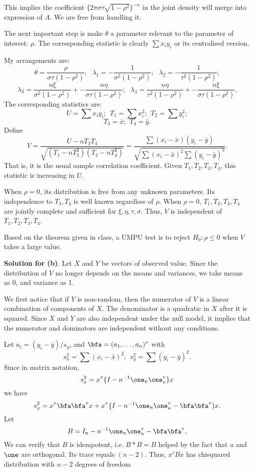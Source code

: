 This implies the coefficient $\{2\pi \sigma \tau \sqrt{1-\rho^2}\}^{-n}$
in the joint density will merge into expression of $A$. We are free
from handling it.

The next important step is make $\theta$ a parameter relevant to
the parameter of interest: $\rho$. The corresponding statistic
is clearly $\sum x_i y_i$ or its centralised version.

My arrangements are:
\[
\theta = \frac{ \rho}{\sigma \tau (1-\rho^2)}; ~~~
\lambda_1 =  - \frac{1 }{\sigma^2 (1-\rho^2)}; ~~~
\lambda_2 =  - \frac{1}{ \tau^2 (1-\rho^2)};
\]
\[
\lambda_3 =  
 \frac{n \xi }{\sigma^2 (1-\rho^2)} +- \frac{n \eta }{\sigma \tau (1-\rho^2)}; ~~~
\lambda_4 = 
 \frac{n \eta }{\tau^2 (1-\rho^2)} +- \frac{n \xi }{\sigma \tau (1-\rho^2)}.
\]
The corresponding statistics are:
\[
U = \sum x_i y_i; ~~T_1 = \sum x_i^2 ; ~~T_2 = \sum y_i^2;
\]
\[
T_3 = \bar x; ~~T_4 = \bar y.
\]
Define
\[
V = \frac{U - n T_3 T_4}{\sqrt{ (T_1 - n T_3^2) (T_2 - n T_4^2)}}
=
\frac{ \sum (x_i - \bar x)(y_i - \bar y)}
{\sqrt{\sum (x_i - \bar x)^2 \sum (y_i - \bar y)^2}}.
\]
That is, it is the usual sample correlation coefficient.
Given $T_1, T_2, T_3, T_4$, this statistic is increasing in $U$.

When $\rho = 0$, its distribution is free from any unknown parameters.
Its independence to $ T_3, T_4$ is well known regardless of $\rho$.
When $\rho = 0$, $T_1, T_2, T_3, T_4$ are jointly complete
and sufficient for $\xi, \eta, \tau, \sigma$. Thus,
$V$ is independent of $T_1, T_2, T_3, T_4$.

Based on the theorem given in class, a UMPU test is
to reject $H_0: \rho \leq 0$ when $V$ takes a large value.

{\bf Solution for (b)}. 
Let $X$ and $Y$ be vectors of observed value.
Since the distribution of $V$ no longer depends on the means
and variances, we take means as 0, and variance as 1.

We first notice that if $Y$ is non-random, then the numerator
of $V$ is a linear combination of components of $X$. 
The denominator is a quadratic in $X$ after it is squared.
Since $X$ and $Y$ are also independent under the null
model, it implies
that the numerator and dominators are independent
without any conditions.

Let $a_i = (y_i - \bar y)/s_y$, and $\bfa = (a_1, \ldots, a_n)^\tau$
with
\[
s_x^2 = \sum (x_i - \bar x)^2; ~~  s_y^2 = \sum (y_i - \bar y)^2.
\]
Since in matrix notation,
\[
s_x^2 = x^\tau \{I -  n^{-1} \one_n \one^\tau_n\} x
\]
we have
\[
s_x^2 
= 
x^\tau \bfa \bfa^\tau x + x^\tau \{I -  n^{-1} \one_n \one^\tau_n - \bfa \bfa^\tau)x.
\]
Let
\[
B = I_n -  n^{-1} \one_n \one^\tau_n - \bfa \bfa^\tau.
\]
We can verify that $B$ is idempotent, i.e. $B*B = B$ helped by 
the fact that $a$ and $\one$ are orthogonal. Its trace equals
$(n-2)$. Thus, $x^\tau B x$ has chisquared
distribution with $n-2$ degrees of freedom


